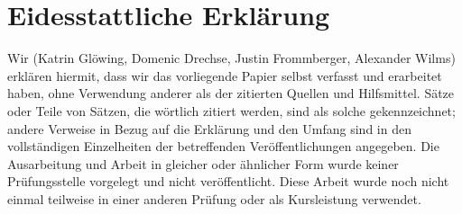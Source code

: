 \section{Eidesstattliche Erklärung}
Wir (Katrin Glöwing, Domenic Drechse, Justin Frommberger, Alexander Wilms) erklären hiermit, dass wir das vorliegende Papier selbst verfasst und erarbeitet haben, ohne Verwendung anderer als der zitierten Quellen und Hilfsmittel. Sätze oder Teile von Sätzen, die wörtlich zitiert werden, sind als solche gekennzeichnet; andere Verweise in Bezug auf die Erklärung und den Umfang sind in den vollständigen Einzelheiten der betreffenden Veröffentlichungen angegeben. Die Ausarbeitung und Arbeit in gleicher oder ähnlicher Form wurde keiner Prüfungsstelle vorgelegt und nicht veröffentlicht. Diese Arbeit wurde noch nicht einmal teilweise in einer anderen Prüfung oder als Kursleistung verwendet.